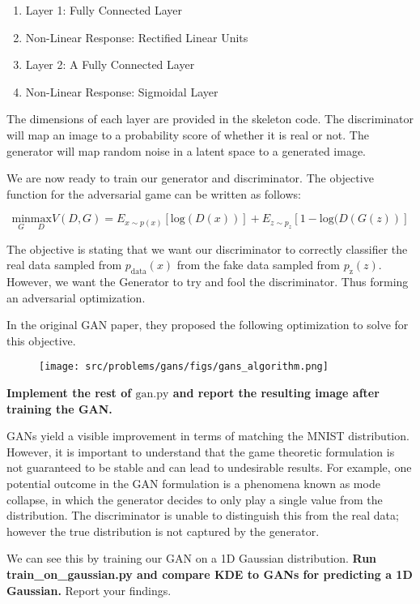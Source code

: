 \begin{Parts}
\begin{enumerate}
\item Layer 1: Fully Connected Layer
\item Non-Linear Response: Rectified Linear Units
\item Layer 2: A Fully Connected Layer 
\item Non-Linear Response: Sigmoidal Layer
\end{enumerate}

The dimensions of each layer are provided in the skeleton code. The discriminator will map an image to a probability score of whether it is real or not. The generator will map random noise in a latent space to a generated image. 


\Part We are now ready to train our generator and discriminator. The objective function for the adversarial game can be written as follows: 

$$\underset{G}{\mbox{min}} \underset{D}{\mbox{max}} V(D,G) = E_{x\sim p(x)} [\mbox{log}(D(x))] + E_{z\sim p_{z}} [1- \mbox{log}(D(G(z))]$$

The objective is stating that we want our discriminator to correctly classifier the real data sampled from $p_{\mbox{data}}(x)$ from the fake data sampled from  $p_{\mbox{z}}(z)$. However, we want the Generator to try and fool the discriminator. Thus forming an adversarial optimization.

In the original GAN paper, they proposed the following optimization to solve for this objective. 

\begin{figure}[!ht]
    \begin{center}
    \texttt{[image: src/problems/gans/figs/gans\_algorithm.png]}
    \end{center}
\end{figure}

{\bf Implement the rest of $\mbox{gan.py}$ and report the resulting image after training the GAN.}




\Part GANs yield a visible improvement in terms of matching the MNIST distribution. However, it is important to understand that the game theoretic formulation is not guaranteed to be stable and can lead to undesirable results. For example, one potential outcome in the GAN formulation is a phenomena known as mode collapse, in which the generator decides to only play a single value from the distribution. The discriminator is unable to distinguish this from the real data; however the true distribution is not captured by the generator. 

We can see this by training our GAN on a 1D Gaussian distribution. {\bf Run \mbox{train\_on\_gaussian.py} and compare KDE to GANs for predicting a 1D Gaussian.} Report your findings.



\end{Parts}

